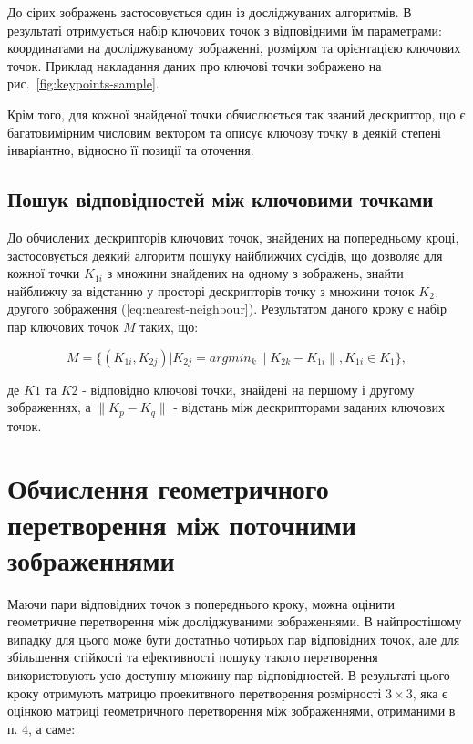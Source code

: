 До сірих зображень застосовується один із досліджуваних алгоритмів. В результаті отримується набір ключових точок з відповідними їм параметрами: координатами на досліджуваному зображенні, розміром та орієнтацією ключових точок. Приклад накладання даних про ключові точки зображено на рис.~\ref{fig:keypoints-sample}.


Крім того, для кожної знайденої точки обчислюється так званий дескриптор, що є багатовимірним числовим вектором та описує ключову точку в деякій степені інваріантно, відносно її позиції та оточення. 

\subsection{Пошук відповідностей між ключовими точками}
До обчислених дескрипторів ключових точок, знайдених на попередньому кроці, застосовується деякий алгоритм пошуку найближчих сусідів, що дозволяє для кожної точки $K_{1i}$ з множини знайдених на одному з зображень, знайти найближчу за відстанню у просторі дескрипторів точку з множини точок $K_{2\cdot}$ другого зображення (\ref{eq:nearest-neighbour}). Результатом даного кроку є набір пар ключових точок $M$ таких, що:

\begin{equation}
\label{eq:nearest-neighbour}
M = \{(K_{1i}, K_{2j}) | K_{2j} = argmin_k{\|K_{2k} - K_{1i}\|}, K_{1i} \in K_1\},
\end{equation}

де $K1$ та $K2$ - відповідно ключові точки, знайдені на першому і другому зображеннях, а $\|K_p - K_q\|$ - відстань між дескрипторами заданих ключових точок.

\section{Обчислення геометричного перетворення між поточними зображеннями}
Маючи пари відповідних точок з попереднього кроку, можна оцінити геометричне перетворення між досліджуваними зображеннями. В найпростішому випадку для цього може бути достатньо чотирьох пар відповідних точок, але для збільшення стійкості та ефективності пошуку такого перетворення використовують усю доступну множину пар відповідностей. В результаті цього кроку отримують матрицю проекитвного перетворення розмірності $3\times3$, яка є оцінкою матриці геометричного перетворення між зображеннями, отриманими в п. 4, а саме:

